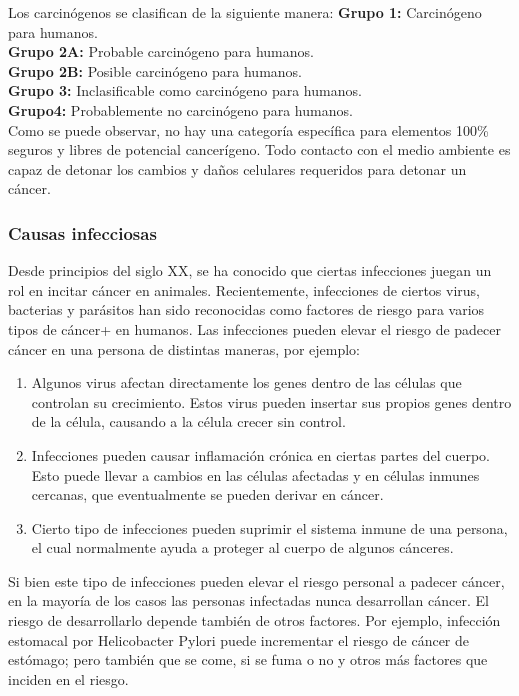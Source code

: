 Los carcinógenos se clasifican de la siguiente manera:
\textbf{Grupo 1:} Carcinógeno para humanos. \\
\textbf{Grupo 2A:} Probable carcinógeno para humanos. \\
\textbf{Grupo 2B:} Posible carcinógeno para humanos. \\
\textbf{Grupo 3:} Inclasificable como carcinógeno para humanos. \\
\textbf{Grupo4:} Probablemente no carcinógeno para humanos. \\ 

Como se puede observar, no hay una categoría específica para elementos 100\%
seguros y libres de potencial cancerígeno. Todo contacto con el medio ambiente
es capaz de detonar los cambios y daños celulares requeridos para detonar un
cáncer.

\subsubsection{Causas infecciosas}

Desde principios del siglo XX, se ha conocido que ciertas infecciones juegan un
rol en incitar cáncer en animales. Recientemente, infecciones de ciertos virus,
bacterias y parásitos han sido reconocidas como factores de riesgo para varios
tipos de cáncer+ en humanos. Las infecciones pueden elevar el riesgo de padecer
cáncer en una persona de distintas maneras, por ejemplo:

\begin{enumerate}
    \item Algunos virus afectan directamente los genes dentro de las células que
    controlan su crecimiento. Estos virus pueden insertar sus propios genes
    dentro de la célula, causando a la célula crecer sin control.
    \item Infecciones pueden causar inflamación crónica en ciertas partes del
    cuerpo. Esto puede llevar a cambios en las células afectadas y en células
    inmunes cercanas, que eventualmente se pueden derivar en cáncer.
    \item Cierto tipo de infecciones pueden suprimir el sistema inmune de una
    persona, el cual normalmente ayuda a proteger al cuerpo de algunos cánceres.
\end{enumerate}

Si bien este tipo de infecciones pueden elevar el riesgo personal a padecer
cáncer, en la mayoría de los casos las personas infectadas nunca desarrollan
cáncer. El riesgo de desarrollarlo depende también de otros factores. Por
ejemplo, infección estomacal por Helicobacter Pylori puede incrementar el riesgo
de cáncer de estómago; pero también que se come, si se fuma o no y otros más
factores que inciden en el riesgo. 

